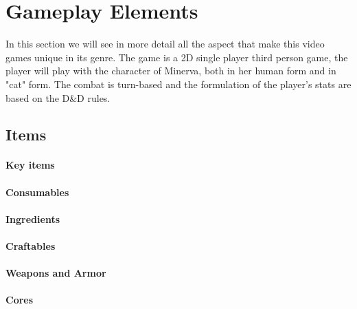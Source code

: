 \section{Gameplay Elements}

In this section we will see in more detail all the aspect that make this video games unique in its genre. The game is a 2D single player third person game, the player will play with the character of Minerva, both in her human form and in "cat" form. The combat is turn-based and the formulation of the player's stats are based on the D\&D rules.




\subsection{Items}

\paragraph{Key items}


\pagebreak
\paragraph{Consumables}


\paragraph{Ingredients}


\paragraph{Craftables}


\paragraph{Weapons and Armor}


\paragraph{Cores}


